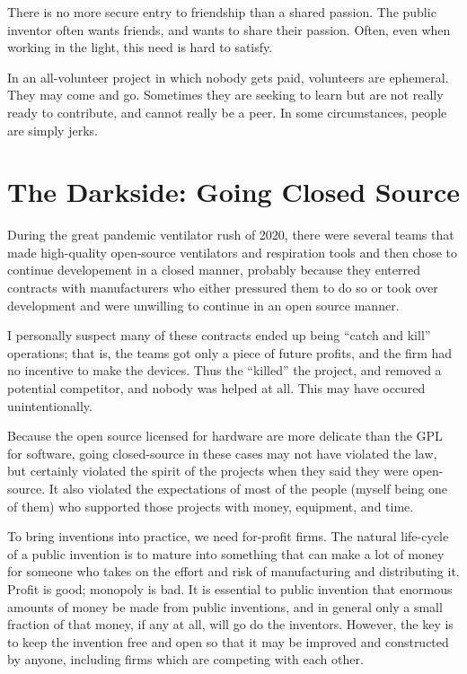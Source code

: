 \documentclass[
	fontsize=10pt, %
	twoside=false, %
	secnumdepth=1, %
]{kaobook}
\begin{document}
There is no more secure entry to friendship than a shared passion.
The public inventor often wants friends, and wants to share
their passion.
Often, even when working in the light, this need
is hard to satisfy.

In an all-volunteer project in which nobody gets paid,
volunteers are ephemeral. They may come and go.
Sometimes they are seeking to learn but are not
really ready to contribute, and cannot really
be a peer.
In some circumstances, people are simply jerks.

\section{The Darkside: Going Closed Source}

During the great pandemic ventilator rush of 2020,
there were several teams that made high-quality
open-source ventilators and respiration tools and
then chose to continue developement in a closed manner,
probably because they enterred contracts with manufacturers
who either pressured them to do so or took over development
and were unwilling to continue in an open source manner.

I personally suspect many of these contracts ended
up being ``catch and kill'' operations; that is,
the teams got only a piece of future profits, and
the firm had no incentive to make the devices.
Thus the ``killed'' the project, and removed a potential
competitor, and nobody was helped at all.
This may have occured unintentionally.

Because the open source licensed for hardware are
more delicate than the GPL for software, going
closed-source in these cases may not have violated
the law, but certainly violated the spirit of the
projects when they said they were open-source.
It also violated the expectations of most
of the people (myself being one of them)
who supported those projects with money,
equipment, and time.

To bring inventions into practice, we need
for-profit firms. The natural life-cycle
of a public invention is to mature into
something that can make a lot of money
for someone who takes on the effort and
risk of manufacturing and distributing it.
Profit is good; monopoly is bad.
It is essential to public invention that
enormous amounts of money be made from public inventions,
and in general only a small fraction of that money,
if any at all, will go do the inventors.
However, the key is to keep the invention
free and open so that it may be improved
and constructed by anyone, including firms
which are competing with each other.
\end{document}
